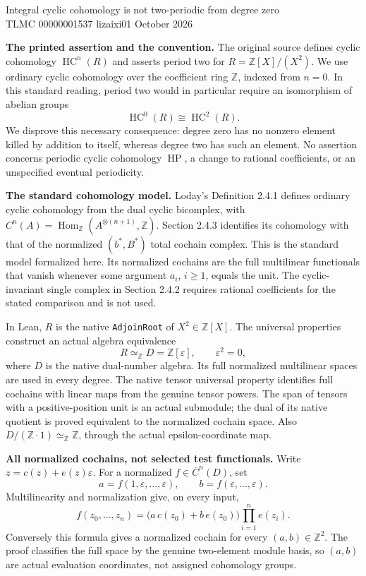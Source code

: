 \documentclass[10pt,a4paper]{article}
\newcommand{\Z}{\mathbb Z}
\newcommand{\HC}{\operatorname{HC}}
\begin{document}
\begin{center}
{\Large Integral cyclic cohomology is not two-periodic from degree zero}\\[4pt]
TLMC 00000001537 \quad lizaixi01  October 2026
\end{center}

\textbf{The printed assertion and the convention.}
The original source defines cyclic cohomology $\HC^n(R)$ and asserts period two
for $R=\Z[X]/(X^2)$. We use ordinary cyclic cohomology over the coefficient
ring $\Z$, indexed from $n=0$. In this standard reading, period two would
in particular require an isomorphism of abelian groups
\[
  \HC^0(R)\cong\HC^2(R).
\]
We disprove this necessary consequence: degree zero has no nonzero element
killed by addition to itself, whereas degree two has such an element.
No assertion concerns periodic cyclic cohomology $\operatorname{HP}$, a change
to rational coefficients, or an unspecified eventual periodicity.

\textbf{The standard cohomology model.}
Loday's Definition 2.4.1 defines ordinary cyclic cohomology from the dual
cyclic bicomplex, with
$C^n(A)=\operatorname{Hom}_{\Z}(A^{\otimes(n+1)},\Z)$.
Section 2.4.3 identifies its cohomology with that of the normalized
$(b^*,B^*)$ total cochain complex. This is the standard model formalized here.
Its normalized cochains are the full multilinear functionals that vanish
whenever some argument $a_i$, $i\ge1$, equals the unit.
The cyclic-invariant single complex in Section 2.4.2 requires rational
coefficients for the stated comparison and is not used.

In Lean, $R$ is the native \texttt{AdjoinRoot} of $X^2\in\Z[X]$.
The universal properties construct an actual algebra equivalence
\[
  R\simeq_{\Z}D=\Z[\varepsilon],\qquad \varepsilon^2=0,
\]
where $D$ is the native dual-number algebra. Its full normalized multilinear
spaces are used in every degree. The native tensor universal property
identifies full cochains with linear maps from the genuine tensor powers.
The span of tensors with a positive-position unit is an actual submodule;
the dual of its native quotient is proved equivalent to the normalized
cochain space. Also $D/(\Z\cdot1)\simeq_{\Z}\Z$, through the actual
epsilon-coordinate map.

\textbf{All normalized cochains, not selected test functionals.}
Write $z=c(z)+e(z)\varepsilon$. For a normalized $f\in\overline C^n(D)$,
set
\[
 a=f(1,\varepsilon,\ldots,\varepsilon),\qquad
 b=f(\varepsilon,\ldots,\varepsilon).
\]
Multilinearity and normalization give, on every input,
\[
 f(z_0,\ldots,z_n)=
 \bigl(a\,c(z_0)+b\,e(z_0)\bigr)\prod_{i=1}^n e(z_i).
 \tag{1}
\]
Conversely this formula gives a normalized cochain for every $(a,b)\in\Z^2$.
The proof classifies the full space by the genuine two-element module basis,
so $(a,b)$ are actual evaluation coordinates, not assigned cohomology groups.
\end{document}
